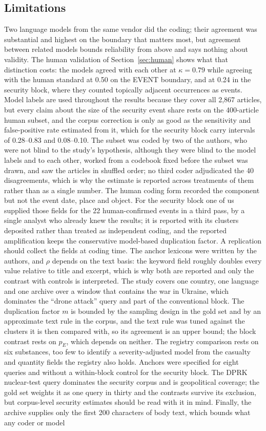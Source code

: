 \documentclass[1p,times]{elsarticle}
\begin{document}
\subsection{Limitations}
\label{sec:limits}
Two language models from the same vendor did the coding; their agreement was substantial and highest on the boundary that matters most, but agreement between related models bounds reliability from above and says nothing about validity. The human validation of Section~\ref{sec:human} shows what that distinction costs: the models agreed with each other at $\kappa = 0.79$ while agreeing with the human standard at 0.50 on the EVENT boundary, and at 0.24 in the security block, where they counted topically adjacent occurrences as events. Model labels are used throughout the results because they cover all 2,867 articles, but every claim about the size of the security event share rests on the 400-article human subset, and the corpus correction is only as good as the sensitivity and false-positive rate estimated from it, which for the security block carry intervals of 0.28--0.83 and 0.08--0.10. The subset was coded by two of the authors, who were not blind to the study's hypothesis, although they were blind to the model labels and to each other, worked from a codebook fixed before the subset was drawn, and saw the articles in shuffled order; no third coder adjudicated the 40 disagreements, which is why the estimate is reported across treatments of them rather than as a single number. The human coding form recorded the component but not the event date, place and object. For the security block one of us supplied those fields for the 22 human-confirmed events in a third pass, by a single analyst who already knew the results; it is reported with its clusters deposited rather than treated as independent coding, and the reported amplification keeps the conservative model-based duplication factor. A replication should collect the fields at coding time. The anchor lexicons were written by the authors, and $\rho$ depends on the text basis: the keyword field roughly doubles every value relative to title and excerpt, which is why both are reported and only the contrast with controls is interpreted. The study covers one country, one language and one archive over a window that contains the war in Ukraine, which dominates the ``drone attack'' query and part of the conventional block. The duplication factor $m$ is bounded by the sampling design in the gold set and by an approximate text rule in the corpus, and the text rule was tuned against the clusters it is then compared with, so its agreement is an upper bound; the block contrast rests on $p_E$, which depends on neither. The registry comparison rests on six substances, too few to identify a severity-adjusted model from the casualty and quantity fields the registry also holds. Anchors were specified for eight queries and without a within-block control for the security block. The DPRK nuclear-test query dominates the security corpus and is geopolitical coverage; the gold set weights it as one query in thirty and the contrasts survive its exclusion, but corpus-level security estimates should be read with it in mind. Finally, the archive supplies only the first 200 characters of body text, which bounds what any coder or model 
\end{document}
